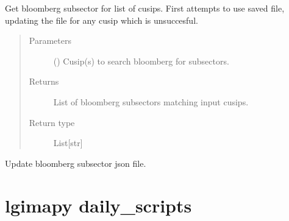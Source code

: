 \documentclass[letterpaper,10pt,english]{report}
\begin{document}
\begin{fulllineitems}
\label{\detokenize{index:lgimapy.bloomberg.get_bloomberg_subsector}}
Get bloomberg subsector for list of cusips. First attempts
to use saved  file, updating the file
for any cusip which is unsuccesful.
\begin{quote}\begin{description}
\item[{Parameters}] \leavevmode
{} (\sphinxstyleliteralemphasis{\sphinxupquote{, }}\sphinxstyleliteralemphasis{\sphinxupquote{{[}}}\sphinxstyleliteralemphasis{\sphinxupquote{{]}}}\sphinxstyleliteralemphasis{\sphinxupquote{}}) \textendash{} Cusip(s) to search bloomberg for subsectors.

\item[{Returns}] \leavevmode
{} \textendash{} List of bloomberg subsectors matching input cusips.

\item[{Return type}] \leavevmode
List{[}str{]}

\end{description}\end{quote}

\end{fulllineitems}


\begin{fulllineitems}
\label{\detokenize{index:lgimapy.bloomberg.update_subsector_json}}
Update bloomberg subsector json file.

\end{fulllineitems}



\chapter{lgimapy daily\_scripts}
\label{\detokenize{index:module-lgimapy.daily_scripts}}\label{\detokenize{index:lgimapy-daily-scripts}}
\end{document}
